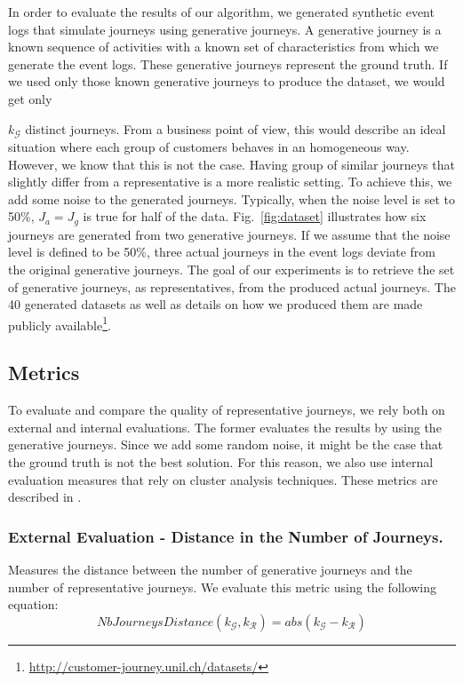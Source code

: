 \documentclass[runningheads]{llncs}
\begin{document}
{{In order to evaluate the results of our algorithm, we generated synthetic event logs that simulate journeys using generative journeys. A generative journey is a known sequence of activities with a known set of characteristics from which we generate the event logs. These generative journeys represent the ground truth. If we used only those known generative journeys to produce the dataset, we would get only {$k_{\mathcal{G}}$ distinct journeys. From a business point of view, this would describe an ideal situation where each group of customers behaves in an homogeneous way. However, we know that this is not the case. 
Having group of similar journeys that slightly differ from a representative is a more realistic setting. To achieve this, we add some noise to the generated journeys. Typically, when the noise level is set to 50\%, $J_a = J_g$ is true for half of the data. Fig.~\ref{fig:dataset} illustrates how six journeys are generated from two generative journeys. If we assume that the noise level is defined to be 50\%, three actual journeys in the event logs deviate from the original generative journeys. The goal of our experiments is to retrieve the set of generative journeys, as representatives, from the produced actual journeys. The 40 generated datasets as well as details on how we produced them are made publicly available\footnote{\url{http://customer-journey.unil.ch/datasets/}}.

\subsection{Metrics}
To evaluate and compare the quality of representative journeys, we rely both on external and internal evaluations. The former evaluates the results by using the generative journeys. Since we add some random noise, it might be the case that the ground truth is not the best solution. For this reason, we also use internal evaluation measures that rely on cluster analysis techniques. These metrics are described in \cite{gabadinho2009extracting}.

\subsubsection{External Evaluation - Distance in the Number of Journeys.} Measures the distance between the number of generative journeys and the number of representative journeys. We evaluate this metric using the following equation:
\begin{equation}
    NbJourneysDistance({k_{\mathcal{G}}}, {k_{\mathcal{R}}}) = abs({k_{\mathcal{G}}} - {k_{\mathcal{R}}}) 
\end{equation}

}}}
\end{document}
